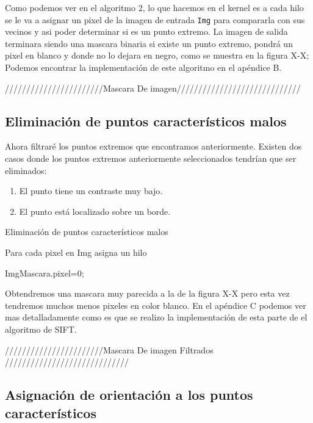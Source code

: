 Como podemos ver en el algoritmo 2, lo que hacemos en el kernel es a cada hilo se le va a asignar un pixel de la imagen de entrada \texttt{Img} para compararla con sus vecinos y asi poder determinar si es un punto extremo. La imagen de salida terminara siendo una mascara binaria si existe un punto extremo, pondrá un pixel en blanco y donde no lo dejara en negro, como se muestra en la figura X-X; Podemos encontrar la implementación de este algoritmo en el apéndice B.


///////////////////////Mascara De imagen/////////////////////////////





\subsection{Eliminación de puntos característicos malos}

Ahora filtraré los puntos extremos que encontramos anteriormente. Existen dos casos donde los puntos extremos anteriormente seleccionados tendrían que ser eliminados:
	\begin{enumerate}
		\item El punto tiene un contraste muy bajo.
		\item El punto está localizado sobre un borde.
	\end{enumerate}		

\begin{algorithm}[H]
\caption{Eliminación de puntos característicos malos}
 Para cada pixel en Img asigna un hilo\;
 
 {
	{
		{
			ImgMascara.pixel=0;
		}
	
				
	}
	
	
		
}
	
\end{algorithm}

Obtendremos una mascara muy parecida a la de la figura X-X pero esta vez tendremos muchos menos pixeles en color blanco. En el apéndice C podemos ver mas detalladamente como es que se realizo la implementación de esta parte de el algoritmo de SIFT.


///////////////////////Mascara De imagen  Filtrados   /////////////////////////////


\subsection{Asignación de orientación a los puntos característicos}


